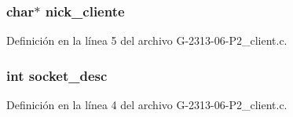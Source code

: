 \subsubsection[{\texorpdfstring{nick\+\_\+cliente}{nick_cliente}}]{\setlength{\rightskip}{0pt plus 5cm}char$\ast$ nick\+\_\+cliente}\hypertarget{G-2313-06-P2__client__err__handlers_8c_ab93a317ee9a27c82844c9128a76b136a}{}\label{G-2313-06-P2__client__err__handlers_8c_ab93a317ee9a27c82844c9128a76b136a}


Definición en la línea 5 del archivo G-\/2313-\/06-\/\+P2\+\_\+client.\+c.

\subsubsection[{\texorpdfstring{socket\+\_\+desc}{socket_desc}}]{\setlength{\rightskip}{0pt plus 5cm}int socket\+\_\+desc}\hypertarget{G-2313-06-P2__client__err__handlers_8c_adeadf7cb6916a10c7142ce7d265ab32a}{}\label{G-2313-06-P2__client__err__handlers_8c_adeadf7cb6916a10c7142ce7d265ab32a}


Definición en la línea 4 del archivo G-\/2313-\/06-\/\+P2\+\_\+client.\+c.

